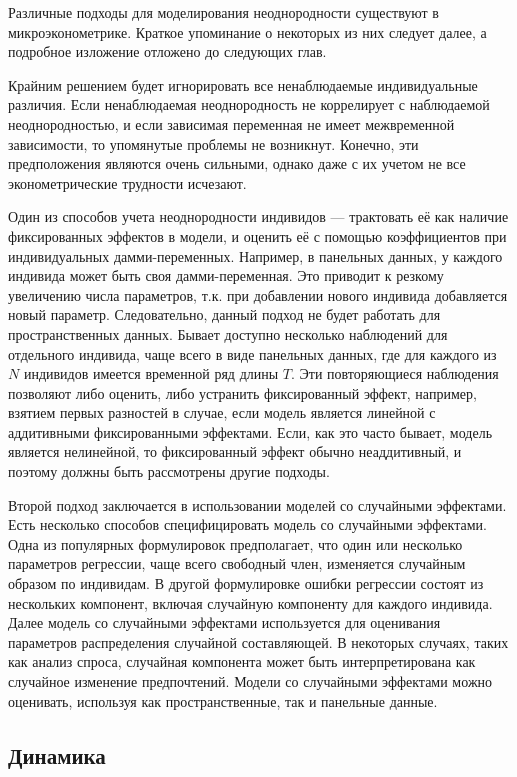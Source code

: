 	
Различные подходы для моделирования неоднородности существуют в микроэконометрике. Краткое упоминание о некоторых из них следует далее, а подробное изложение отложено до следующих глав.
	
	
Крайним решением будет игнорировать все ненаблюдаемые индивидуальные различия. Если ненаблюдаемая неоднородность не коррелирует с наблюдаемой неоднородностью, и если зависимая переменная не имеет межвременной зависимости, то упомянутые проблемы не возникнут. Конечно, эти  предположения являются очень сильными, однако даже с их учетом  не все эконометрические трудности исчезают.
	
	
Один из способов учета неоднородности индивидов --- трактовать её как наличие фиксированных эффектов в модели, и оценить её с помощью коэффициентов при  индивидуальных дамми-переменных.
Например, в панельных данных, у каждого индивида может быть своя дамми-переменная. Это приводит к резкому увеличению числа параметров, т.к. при добавлении нового индивида добавляется новый параметр. Следовательно, данный подход не будет работать для пространственных данных. 
Бывает доступно несколько наблюдений для отдельного индивида, чаще всего в виде панельных данных, где для каждого из $N$ индивидов имеется временной ряд длины $T$.
Эти повторяющиеся наблюдения позволяют либо оценить, либо устранить фиксированный эффект, например, взятием первых разностей в случае, если модель является линейной с аддитивными  фиксированными эффектами. 
Если, как это часто бывает, модель является нелинейной, то фиксированный эффект обычно неаддитивный, и поэтому должны быть рассмотрены другие подходы.
	
	
Второй подход заключается в использовании моделей со случайными эффектами. Есть несколько способов специфицировать модель со случайными эффектами. Одна из популярных формулировок предполагает, что один или несколько параметров регрессии, чаще всего свободный член, изменяется случайным образом по индивидам. 
В другой формулировке ошибки регрессии состоят из нескольких компонент, включая случайную компоненту для каждого индивида.  Далее модель со случайными эффектами используется для оценивания  параметров распределения случайной составляющей. В некоторых случаях, таких как анализ спроса, случайная компонента может быть интерпретирована как случайное изменение предпочтений. Модели со случайными эффектами можно оценивать, используя как пространственные, так и панельные данные.
	

\subsection{Динамика}


